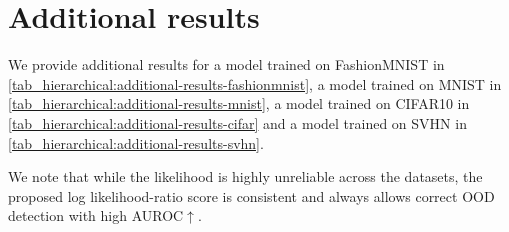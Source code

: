 {\section{Additional results} \label{sec_hierarchical:additional-results}
We provide additional results for a model trained on FashionMNIST in \cref{tab_hierarchical:additional-results-fashionmnist}, a model trained on MNIST in \cref{tab_hierarchical:additional-results-mnist}, a model trained on CIFAR10 in \cref{tab_hierarchical:additional-results-cifar} and a model trained on SVHN in \cref{tab_hierarchical:additional-results-svhn}.

We note that while the likelihood is highly unreliable across the datasets, the proposed log likelihood-ratio score is consistent and always allows correct OOD detection with high AUROC$\uparrow$.

}
